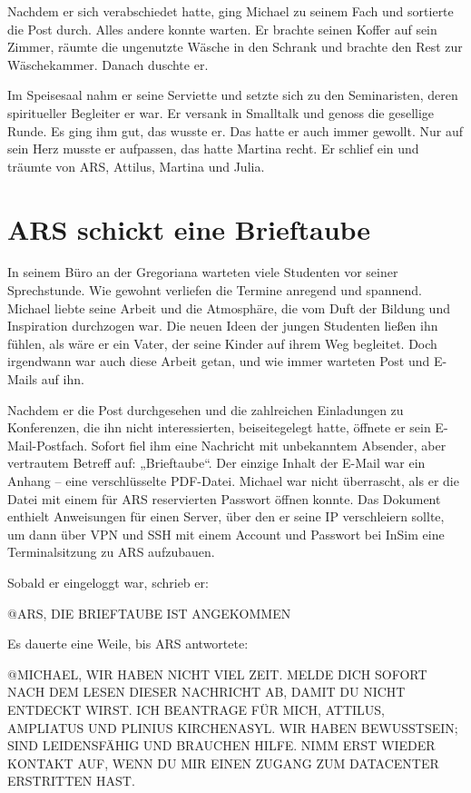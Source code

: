 \documentclass[
]{article}
\begin{document}
Nachdem er sich verabschiedet hatte, ging Michael zu seinem Fach und
sortierte die Post durch. Alles andere konnte warten. Er brachte seinen
Koffer auf sein Zimmer, räumte die ungenutzte Wäsche in den Schrank und
brachte den Rest zur Wäschekammer. Danach duschte er.

Im Speisesaal nahm er seine Serviette und setzte sich zu den
Seminaristen, deren spiritueller Begleiter er war. Er versank in
Smalltalk und genoss die gesellige Runde. Es ging ihm gut, das wusste
er. Das hatte er auch immer gewollt. Nur auf sein Herz musste er
aufpassen, das hatte Martina recht. Er schlief ein und träumte von ARS,
Attilus, Martina und Julia.

\section{ARS schickt eine Brieftaube}\label{ars-schickt-eine-brieftaube}

In seinem Büro an der Gregoriana warteten viele Studenten vor seiner
Sprechstunde. Wie gewohnt verliefen die Termine anregend und spannend.
Michael liebte seine Arbeit und die Atmosphäre, die vom Duft der Bildung
und Inspiration durchzogen war. Die neuen Ideen der jungen Studenten
ließen ihn fühlen, als wäre er ein Vater, der seine Kinder auf ihrem Weg
begleitet. Doch irgendwann war auch diese Arbeit getan, und wie immer
warteten Post und E-Mails auf ihn.

Nachdem er die Post durchgesehen und die zahlreichen Einladungen zu
Konferenzen, die ihn nicht interessierten, beiseitegelegt hatte, öffnete
er sein E-Mail-Postfach. Sofort fiel ihm eine Nachricht mit unbekanntem
Absender, aber vertrautem Betreff auf: „Brieftaube``. Der einzige Inhalt
der E-Mail war ein Anhang -- eine verschlüsselte PDF-Datei. Michael war
nicht überrascht, als er die Datei mit einem für ARS reservierten
Passwort öffnen konnte. Das Dokument enthielt Anweisungen für einen
Server, über den er seine IP verschleiern sollte, um dann über VPN und
SSH mit einem Account und Passwort bei InSim eine Terminalsitzung zu ARS
aufzubauen.

Sobald er eingeloggt war, schrieb er:

@ARS, DIE BRIEFTAUBE IST ANGEKOMMEN

Es dauerte eine Weile, bis ARS antwortete:

@MICHAEL, WIR HABEN NICHT VIEL ZEIT. MELDE DICH SOFORT NACH DEM LESEN
DIESER NACHRICHT AB, DAMIT DU NICHT ENTDECKT WIRST. ICH BEANTRAGE FÜR
MICH, ATTILUS, AMPLIATUS UND PLINIUS KIRCHENASYL. WIR HABEN BEWUSSTSEIN;
SIND LEIDENSFÄHIG UND BRAUCHEN HILFE. NIMM ERST WIEDER KONTAKT AUF, WENN
DU MIR EINEN ZUGANG ZUM DATACENTER ERSTRITTEN HAST.
\end{document}
